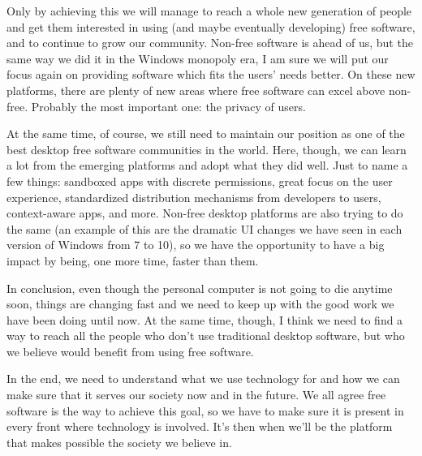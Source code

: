 Only by achieving this we will manage to reach a whole new generation of people and get them interested in using (and maybe eventually developing) free software, and to continue to grow our community. Non-free software is ahead of us, but the same way we did it in the Windows monopoly era, I am sure we will put our focus again on providing software which fits the users’ needs better. On these new platforms, there are plenty of new areas where free software can excel above non-free. Probably the most important one: the privacy of users.

At the same time, of course, we still need to maintain our position as one of the best desktop free software communities in the world. Here, though, we can learn a lot from the emerging platforms and adopt what they did well. Just to name a few things: sandboxed apps with discrete permissions, great focus on the user experience, standardized distribution mechanisms from developers to users, context-aware apps, and more. Non-free desktop platforms are also trying to do the same (an example of this are the dramatic UI changes we have seen in each version of Windows from 7 to 10), so we have the opportunity to have a big impact by being, one more time, faster than them.

In conclusion, even though the personal computer is not going to die anytime soon, things are changing fast and we need to keep up with the good work we have been doing until now. At the same time, though, I think we need to find a way to reach all the people who don't use traditional desktop software, but who we believe would benefit from using free software.

In the end, we need to understand what we use technology for and how we can make sure that it serves our society now and in the future. We all agree free software is the way to achieve this goal, so we have to make sure it is present in every front where technology is involved. It’s then when we’ll be the platform that makes possible the society we believe in.
